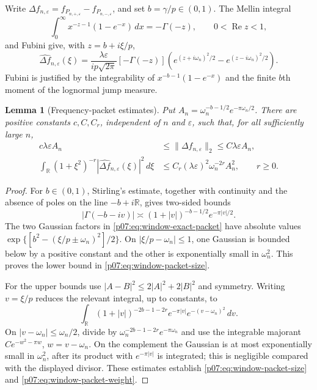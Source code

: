 \documentclass[11pt,letterpaper]{article}
\newtheorem{lemma}[theorem]{Lemma}
\theoremstyle{definition}
\theoremstyle{remark}
\newcommand{\1}{\mathbf 1}
\begin{document}
Write $\Delta f_{n,\varepsilon}=f_{P_{n,+,\varepsilon}}-
f_{P_{n,-,\varepsilon}}$, and set $b=\gamma/p\in(0,1)$.
The Mellin integral
\[
 \int_0^\infty x^{-z-1}(1-e^{-x})\,dx=-\Gamma(-z),
                      \qquad 0<\operatorname{Re}z<1,
\]
and Fubini give, with $z=b+i\xi/p$,
\begin{equation}\label{p07:eq:window-exact-packet}
 \widehat{\Delta f}_{n,\varepsilon}(\xi)=
 \frac{\lambda\varepsilon}{ip\sqrt{2\pi}}
 [-\Gamma(-z)]
 \left(e^{(z+i\omega_n)^2/2}-e^{(z-i\omega_n)^2/2}\right).
\end{equation}
Fubini is justified by the integrability of $x^{-b-1}(1-e^{-x})$
and the finite $b$th moment of the lognormal jump measure.

\begin{lemma}[Frequency-packet estimates]\label{p07:lem:window-packets}
Put $A_n=\omega_n^{-b-1/2}e^{-\pi\omega_n/2}$.
There are positive constants $c,C,C_r$, independent of $n$ and
$\varepsilon$, such that, for all sufficiently large $n$,
\begin{align}
 c\lambda\varepsilon A_n
 &\le \|\Delta f_{n,\varepsilon}\|_2
                   \le C\lambda\varepsilon A_n,
                    \label{p07:eq:window-packet-size}\\
 \int_{\mathbb R}(1+\xi^2)^{-r}
       |\widehat{\Delta f}_{n,\varepsilon}(\xi)|^2\,d\xi
 &\le C_r(\lambda\varepsilon)^2\omega_n^{-2r}A_n^2,
                  \qquad r\ge0.\label{p07:eq:window-packet-weight}
\end{align}
\end{lemma}
\begin{proof}
For $b\in(0,1)$, Stirling's estimate, together with continuity and
the absence of poles on the line $-b+i\mathbb R$, gives two-sided
bounds
\[
 |\Gamma(-b-iv)|\asymp
                   (1+|v|)^{-b-1/2}e^{-\pi|v|/2}.
\]
The two Gaussian factors in \eqref{p07:eq:window-exact-packet} have
absolute values
$\exp\{[b^2-(\xi/p\pm\omega_n)^2]/2\}$.
On $|\xi/p-\omega_n|\le1$, one Gaussian is bounded below by a
positive constant and the other is exponentially small in
$\omega_n^2$.  This proves the lower bound in
\eqref{p07:eq:window-packet-size}.

For the upper bounds use $|A-B|^2\le2|A|^2+2|B|^2$ and symmetry.
Writing $v=\xi/p$ reduces the relevant integral, up to constants,
to
\[
 \int_{\mathbb R}(1+|v|)^{-2b-1-2r}
          e^{-\pi|v|}e^{-(v-\omega_n)^2}\,dv.
\]
On $|v-\omega_n|\le\omega_n/2$, divide by
$\omega_n^{-2b-1-2r}e^{-\pi\omega_n}$ and use the integrable
majorant $C e^{-w^2-\pi w}$, $w=v-\omega_n$.
On the complement the Gaussian is at most exponentially small in
$\omega_n^2$, after its product with $e^{-\pi|v|}$ is integrated;
this is negligible compared with the displayed divisor.
These estimates establish \eqref{p07:eq:window-packet-size} and
\eqref{p07:eq:window-packet-weight}.
\end{proof}
\end{document}
